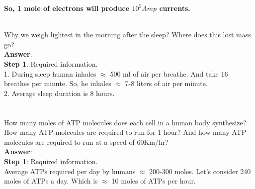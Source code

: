 \documentclass[11pt]{exam}
\begin{document}
\begin{questions}
\textbf{So, 1 mole of electrons will produce $10^{5} Amp$ currents.}   \\ \\           
                

\question
\label{Q9:Lightest morning}

Why we weigh lightest in the morning after the sleep? Where does this lost mass go? \\
\textbf{Answer}: \\
\textbf{Step 1}. Required information.\\
               1. During sleep human inhales $\approx$ 500 ml of air per breathe. And take 16 breathes per minute. So, he inhales $\approx$ 7-8 liters of air per minute. \\
               2. Average sleep duration is 8 hours.  \\ 
               
 \\ \\


\question
\label{Q10:ATPs}
How many moles of ATP molecules does each cell in a human body synthesize? How many ATP molecules are required to run for 1 hour? And how many ATP molecules are required to run at a speed of 60Km/hr? \\
\textbf{Answer}: \\
\textbf{Step 1}: Required information. \\
                 Average ATPs required per day by humans $\approx$ 200-300 moles. Let's consider 240 moles of ATPs a day. Which is $\approx$ 10 moles of ATPs per hour. \\ 


\end{questions}
\end{document}
